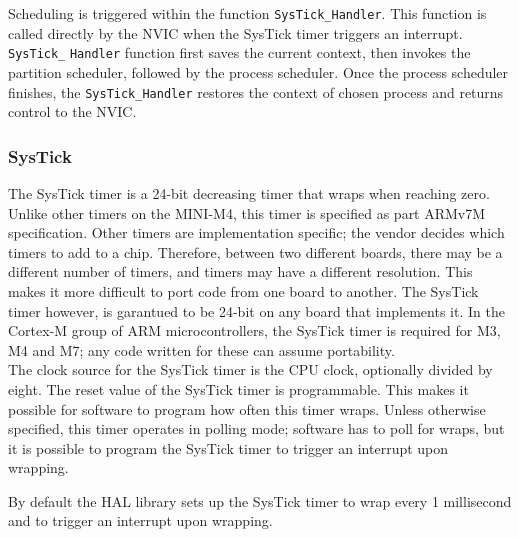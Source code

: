 Scheduling is triggered within the function \texttt{SysTick\_Handler}. This
function is called directly by the NVIC when the SysTick timer triggers an
interrupt. \texttt{SysTick\_} \texttt{Handler} function first saves the current
context, then invokes the partition scheduler, followed by the process scheduler.
Once the process scheduler finishes, the \texttt{SysTick\_}\texttt{Handler}
restores the context of chosen process and returns control to the NVIC.

\subsubsection{SysTick}
The SysTick timer is a 24-bit decreasing timer that wraps when reaching zero.
Unlike other timers on the MINI-M4, this timer is specified as part ARMv7M
specification. Other timers are implementation specific; the vendor decides
which timers to add to a chip. Therefore, between two different boards, there
may be a different number of timers, and timers may have a different resolution.
This makes it more difficult to port code from one board to another. The SysTick
timer however, is garantued to be 24-bit on any board that implements it. In the
Cortex-M group of ARM microcontrollers, the SysTick timer is required for M3, M4
and M7; any code written for these can assume portability.\\

The clock source for the SysTick timer is the CPU clock, optionally divided by
eight. The reset value of the SysTick timer is programmable. This makes it
possible for software to program how often this timer wraps.
Unless otherwise specified, this timer operates in polling mode; software has to
poll for wraps, but it is possible to program the SysTick timer to trigger an
interrupt upon wrapping.

By default the HAL library sets up the SysTick timer to wrap every 1 millisecond
and to trigger an interrupt upon wrapping.

